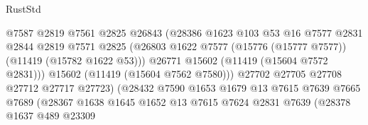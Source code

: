 \begin{lexlean}{RustStd}
\begin{coremodule}
                                        @7587
                                        @2819
                                        @7561
                                        @2825
                                        @26843
                                        (@28386
                                          @1623
                                          @103
                                          @53
                                          @16
                                          @7577
                                          @2831
                                          @2844
                                          @2819
                                          @7571
                                          @2825
                                          (@26803
                                            @1622
                                            @7577
                                            (@15776 (@15777 @7577))
                                            (@11419 (@15782 @1622 @53)))
                                          @26771
                                          @15602
                                          (@11419 (@15604 @7572 @2831)))
                                        @15602
                                        (@11419 (@15604 @7562 @7580)))
                                      @27702
                                      @27705
                                      @27708
                                      @27712
                                      @27717
                                      @27723)
                                    (@28432
                                      @7590
                                      @1653
                                      @1679
                                      @13
                                      @7615
                                      @7639
                                      @7665
                                      @7689
                                      (@28367
                                        @1638
                                        @1645
                                        @1652
                                        @13
                                        @7615
                                        @7624
                                        @2831
                                        @7639
                                        (@28378
                                          @1637
                                          @489
                                          @23309

\end{coremodule}
\end{lexlean}
